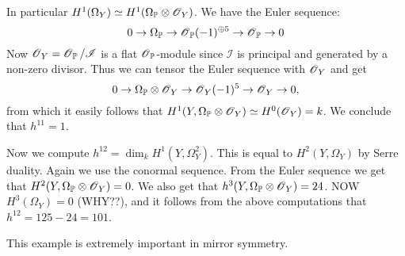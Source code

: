 \documentclass[11pt, english]{article}
\begin{document}
In particular $H^1(\Omega_Y) \simeq H^1(\Omega_{\mathbb{P}} \otimes \operatorname{\mathscr{O}}_Y)$. We have the Euler sequence:
$$
0 \to \Omega_{\mathbb{P}} \to \operatorname{\mathscr{O}}_{\mathbb{P}}(-1)^{\oplus 5} \to \operatorname{\mathscr{O}}_{\mathbb{P}} \to 0
$$
Now $\operatorname{\mathscr{O}}_Y=\operatorname{\mathscr{O}}_{\mathbb{P}}/\mathscr I$ is a flat $\operatorname{\mathscr{O}}_{\mathbb{P}}$-module since $\mathscr I$ is principal and generated by a non-zero divisor. Thus we can tensor the Euler sequence with $\operatorname{\mathscr{O}}_Y$ and get
$$
0 \to \Omega_{\mathbb{P}} \otimes \operatorname{\mathscr{O}}_Y \to \operatorname{\mathscr{O}}_Y(-1)^5 \to \operatorname{\mathscr{O}}_Y \to 0,
$$
from which it easily follows that $H^1(Y,\Omega_{\mathbb{P}} \otimes \operatorname{\mathscr{O}}_Y) \simeq H^0(\operatorname{\mathscr{O}}_Y) = k$. We conclude that $h^{11}=1$. 

Now we compute $h^{12} = \dim_k H^1(Y,\Omega_Y^2)$. This is equal to $H^2(Y, \Omega_Y)$ by Serre duality. Again we use the conormal sequence. From the Euler sequence we get that $H^2(Y, \Omega_{\mathbb{P}} \otimes \operatorname{\mathscr{O}}_Y)=0$. We also get that $h^3(Y,\Omega_{\mathbb{P}} \otimes \operatorname{\mathscr{O}}_Y)=24$. NOW $H^3(\Omega_Y)=0$ (WHY??), and it follows from the above computations that $h^{12}=125-24=101$.

This example is extremely important in mirror symmetry.



\end{document}
